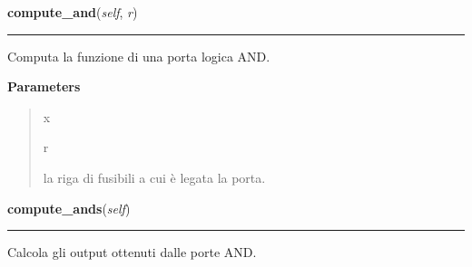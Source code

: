     \label{pla:Pla:compute_and}

    \vspace{0.5ex}

\hspace{.8\funcindent}\begin{boxedminipage}{\funcwidth}

    \raggedright \textbf{compute\_and}(\textit{self}, \textit{r})

    \vspace{-1.5ex}

    \rule{\textwidth}{0.5\fboxrule}
\setlength{\parskip}{2ex}
    Computa la funzione di una porta logica AND.

\setlength{\parskip}{1ex}
      \textbf{Parameters}
      \vspace{-1ex}

      \begin{quote}
        \begin{Ventry}{x}

          \item[r]

          la riga di fusibili a cui è legata la porta.

        \end{Ventry}

      \end{quote}

    \end{boxedminipage}

    \label{pla:Pla:compute_ands}

    \vspace{0.5ex}

\hspace{.8\funcindent}\begin{boxedminipage}{\funcwidth}

    \raggedright \textbf{compute\_ands}(\textit{self})

    \vspace{-1.5ex}

    \rule{\textwidth}{0.5\fboxrule}
\setlength{\parskip}{2ex}
    Calcola gli output ottenuti dalle porte AND.

\setlength{\parskip}{1ex}
    \end{boxedminipage}

    \label{pla:Pla:compute_out}


